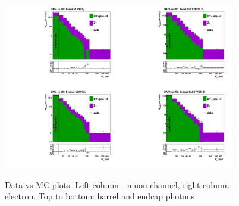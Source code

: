 \begin{figure}[htb]
  \begin{center}
   \includegraphics[width=0.45\textwidth]{../figs/figs_v11/MUON_ZGamma/PrepareYields/c_TotalDATAvsMC_Barrel__phoEt.pdf}\includegraphics[width=0.45\textwidth]{../figs/figs_v11/ELECTRON_ZGamma/PrepareYields/c_TotalDATAvsMC_Barrel__phoEt.pdf}
   \includegraphics[width=0.45\textwidth]{../figs/figs_v11/MUON_ZGamma/PrepareYields/c_TotalDATAvsMC_Endcap__phoEt.pdf}\includegraphics[width=0.45\textwidth]{../figs/figs_v11/ELECTRON_ZGamma/PrepareYields/c_TotalDATAvsMC_Endcap__phoEt.pdf}
  \caption{Data vs MC plots. Left column - muon channel, right column - electron. Top to bottom: barrel and endcap photons}
  \label{fig:DATAvsMC_Zg}
  \end{center}
\end{figure}

